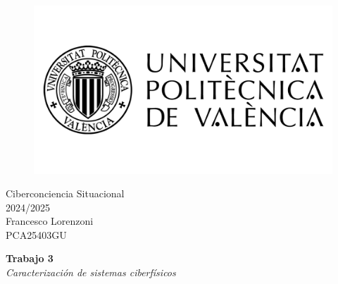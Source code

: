 \begin{titlepage}
   \begin{figure}
      \vspace{50mm}
       \centering
       \includegraphics[keepaspectratio=true,width=0.40\columnwidth]{images/upvLogo.png}
   \end{figure}
   
   \vspace{40mm}
   \begin{center}
       \LARGE{Ciberconciencia Situacional}
       \vspace{2.5mm}
       \\ \large{2024/2025}
       \vspace{5mm}
       \\ \large{Francesco Lorenzoni\\\textsc{PCA25403GU}}
    \end{center}
   
   \begin{center}
      \vspace{10mm}
       {\LARGE{\textbf{Trabajo 3}\\ \vspace{5mm}
       \textit{Caracterización de sistemas ciberfísicos}}}
       
   \end{center}
\end{titlepage}